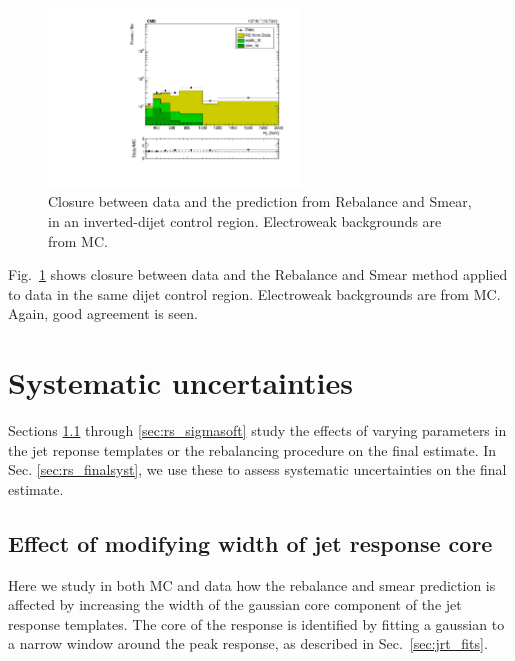 \begin{figure}[htp!]
  \begin{center}
    \includegraphics[width=0.60\textwidth]{figs/qcd/rs_data/monojet/dataAll_crRSInvertDPhibaseJ_htbins.pdf}
    \caption{Closure between data and the prediction from Rebalance and Smear, in an inverted-\dpmin dijet
control region. Electroweak backgrounds are from MC.
            }
    \label{Fig:rs_monojet_data_validation}
  \end{center}
\end{figure}

Fig.~\ref{Fig:rs_monojet_data_validation} shows closure between data and the Rebalance and Smear method applied to data
in the same dijet control region. Electroweak backgrounds are from MC. Again, good agreement is seen.

\section{Systematic uncertainties}
\label{sec:rs_systematics}

Sections \ref{sec:rs_jrt_core} through \ref{sec:rs_sigmasoft} study the effects of varying
parameters in the jet reponse templates or the rebalancing procedure on the final estimate.
In Sec. \ref{sec:rs_finalsyst}, we use these to assess systematic uncertainties on the final estimate.

\subsection{Effect of modifying width of jet response core}
\label{sec:rs_jrt_core}

Here we study in both MC and data how the rebalance and smear prediction is affected by increasing the width of the gaussian core component of the jet response templates. 
The core of the response is identified by fitting a gaussian to a narrow window around the peak response, as described in Sec.~\ref{sec:jrt_fits}.

